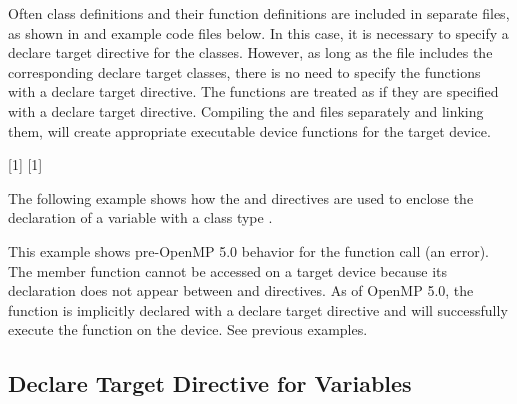 Often class definitions and their function definitions are included in separate files,
as shown in  and  example code files below.
In this case, it is necessary to specify a declare target directive for the classes.
However, as long as the  file includes the corresponding declare target classes,
there is no need to specify the functions with a declare target directive.
The functions are treated as if they are specified with a declare target directive.
Compiling the  and  files 
separately and linking them, will create appropriate executable device functions for the target device.

\smallskip
{}[1]
\smallskip
{}[1]

{}

The following example shows how the  and  directives are used to enclose the declaration 
of a variable  with a class type . 

This example shows pre-OpenMP 5.0 behavior for the  function call (an error).
The member function  cannot be accessed on a target device because its 
declaration does not appear between  and 
 directives. As of OpenMP 5.0, the
function is implicitly declared with a declare target directive 
and will successfully execute the function on the device.  See previous examples.

\cppspecificend

\subsection{Declare Target Directive for Variables}
\label{subsec:declare_target_variables}


